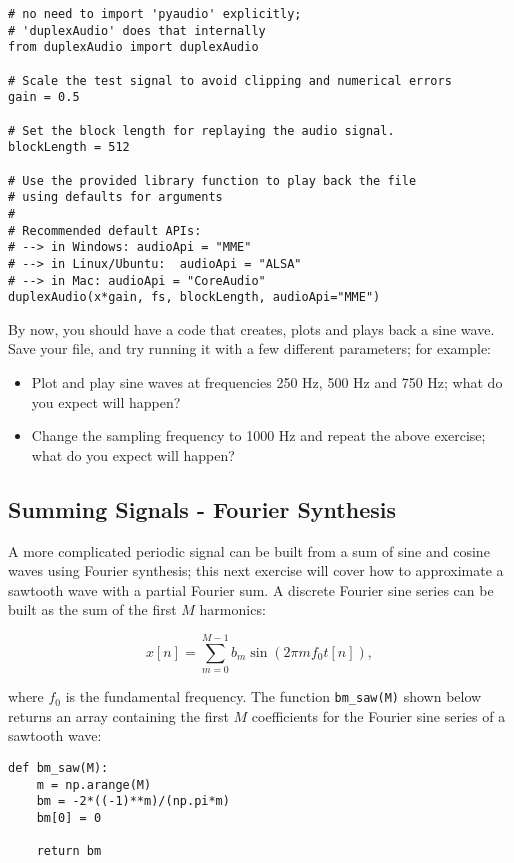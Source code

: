 \begin{lstlisting}[frame=single]
# no need to import 'pyaudio' explicitly;
# 'duplexAudio' does that internally
from duplexAudio import duplexAudio

# Scale the test signal to avoid clipping and numerical errors
gain = 0.5

# Set the block length for replaying the audio signal.
blockLength = 512

# Use the provided library function to play back the file
# using defaults for arguments
#
# Recommended default APIs:
# --> in Windows: audioApi = "MME"
# --> in Linux/Ubuntu:  audioApi = "ALSA"
# --> in Mac: audioApi = "CoreAudio"
duplexAudio(x*gain, fs, blockLength, audioApi="MME")
\end{lstlisting}

By now, you should have a code that creates, plots and plays back a sine wave. Save your file, and try running it with a few different parameters; for example:

\begin{itemize}
	\item Plot and play sine waves at frequencies 250 Hz, 500 Hz and 750 Hz; what do you expect will happen?
	\item Change the sampling frequency to 1000 Hz and repeat the above exercise; what do you expect will happen?
\end{itemize}


\subsection{Summing Signals - Fourier Synthesis}

A more complicated periodic signal can be built from a sum of sine and cosine waves using Fourier synthesis; this next exercise will cover how to approximate a sawtooth wave with a partial Fourier sum. A discrete Fourier sine series can be built as the sum of the first $M$ harmonics:

\begin{equation}
	x[n] = \sum_{m=0}^{M-1} b_m \sin(2 \pi m f_0 t[n]),
\end{equation}

where $f_0$ is the fundamental frequency. The function {\tt bm\_saw(M)} shown below returns an array containing the first $M$ coefficients for the Fourier sine series of a sawtooth wave:

\begin{lstlisting}[frame=single]
def bm_saw(M):
    m = np.arange(M)
    bm = -2*((-1)**m)/(np.pi*m)
    bm[0] = 0

    return bm
\end{lstlisting}


